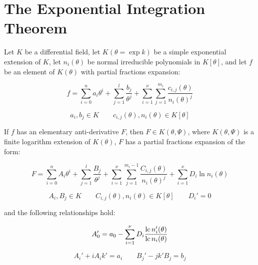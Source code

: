 \vfill\eject
\section{The Exponential Integration Theorem}

\theorem\label{exponential integration theorem}
Let $K$ be a differential field, let $K(\theta = \exp k)$ be a simple
exponential extension of $K$, let $n_i(\theta)$ be
normal irreducible polynomials in $K[\theta]$,
and let $f$ be an element of $K(\theta)$
with partial fractions expansion:

\begin{equation}
\label{exponential integration theorem - integrand}
f = \sum_{i=0}^n a_i \theta^i + \sum_{j=1}^{l} \frac{b_{j}}{\theta^j}
+ \sum_{i=1}^\nu \sum_{j=1}^{m_i} \frac{c_{i,j}(\theta)}{n_i(\theta)^j}
\end{equation}

$$a_i, b_j \in K \qquad c_{i,j}(\theta),n_i(\theta) \in K[\theta]$$

If $f$ has
an elementary anti-derivative $F$, then $F \in K(\theta, \Psi)$,
where $K(\theta, \Psi)$ is a finite logarithm extension
of $K(\theta)$, $F$ has a partial fractions expansion of the form:

\begin{equation}
\label{exponential integration theorem - integral}
F = \sum_{i=0}^n A_i \theta^i + \sum_{j=1}^{l} \frac{B_{j}}{\theta^j}
+ \sum_{i=1}^\nu \sum_{j=1}^{m_i-1} \frac{C_{i,j}(\theta)}{n_i(\theta)^j}
+ \sum_{i=1}^\nu D_i \ln n_i(\theta)
\end{equation}

$$A_i, B_j \in K \qquad C_{i,j}(\theta),n_i(\theta) \in K[\theta] \qquad D_i' = 0$$

and the following relationships hold:

\begin{equation}
\label{eq: exponential A0}
A_0' = a_0 - \sum_{i=1}^\nu D_i \frac{{\rm lc\,} n_i'(\theta)}{{\rm lc\,} n_i(\theta)}
\end{equation}

\begin{equation}
\label{eq: exponential An}
A_i' + i A_i k' = a_i  \qquad  B_{j}' - j k' B_{j} = b_j
\end{equation}


